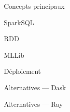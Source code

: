 \begin{frame}{Concepts principaux}
  
\end{frame}

\begin{frame}{SparkSQL}
  
\end{frame}

\begin{frame}{RDD}
  
\end{frame}

\begin{frame}{MLLib}
  
\end{frame}

\begin{frame}{Déploiement}
  
\end{frame}

\begin{frame}{Alternatives --- Dask}
  
\end{frame}

\begin{frame}{Alternatives --- Ray}
  
\end{frame}
